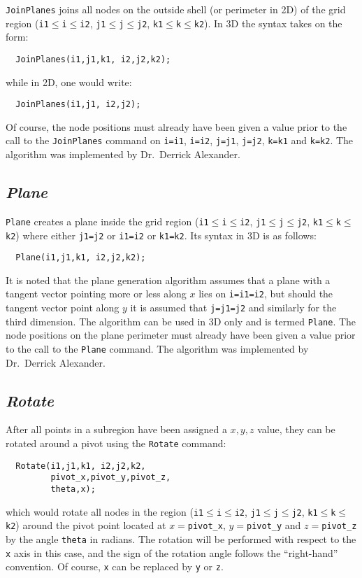 \documentclass{warpdoc}
\begin{document}
\verb|JoinPlanes| joins all nodes on the outside shell (or perimeter in 2D) of the
grid region (\verb|i1|$\leq$\verb|i|$\leq$\verb|i2|,
  \verb|j1|$\leq$\verb|j|$\leq$\verb|j2|,
  \verb|k1|$\leq$\verb|k|$\leq$\verb|k2|). In 3D the syntax takes on the form:
%
\begin{verbatim}
  JoinPlanes(i1,j1,k1, i2,j2,k2);
\end{verbatim}
%
while in 2D, one would write:
%
\begin{verbatim}
  JoinPlanes(i1,j1, i2,j2);
\end{verbatim}
%
Of course, the node positions must already have been given a value prior
to the call to the \verb|JoinPlanes| command on
\verb|i=i1|, \verb|i=i2|, \verb|j=j1|, \verb|j=j2|, \verb|k=k1| and
\verb|k=k2|. The algorithm was implemented by Dr.\ Derrick Alexander.


\subsection{\emph{Plane}}

\verb|Plane| creates a plane inside the
grid region (\verb|i1|$\leq$\verb|i|$\leq$\verb|i2|,
  \verb|j1|$\leq$\verb|j|$\leq$\verb|j2|,
  \verb|k1|$\leq$\verb|k|$\leq$\verb|k2|) where either
  \verb|j1=j2| or \verb|i1=i2| or \verb|k1=k2|. Its syntax in 3D is as follows:
%
\begin{verbatim}
  Plane(i1,j1,k1, i2,j2,k2);
\end{verbatim}
%
It is noted that the plane generation algorithm  assumes that a plane
with a tangent vector pointing more or less along $x$ lies on \verb|i=i1=i2|, but
should the tangent vector point along $y$ it is assumed that \verb|j=j1=j2|
and similarly for the third dimension.
The algorithm can be used in 3D only and is termed \verb|Plane|. 
The node positions on the plane perimeter must already have been given a value prior
to the call to the \verb|Plane| command. The algorithm was 
implemented by Dr.\ Derrick Alexander.


\subsection{\emph{Rotate}}

After all points in a subregion have been assigned
a  $x,y,z$ value, they can be rotated around a pivot
using the \verb|Rotate| command:
%
\begin{verbatim}
  Rotate(i1,j1,k1, i2,j2,k2,
         pivot_x,pivot_y,pivot_z,
         theta,x);
\end{verbatim}
%
which would rotate all nodes in the region
(\verb|i1|$\leq$\verb|i|$\leq$\verb|i2|,
  \verb|j1|$\leq$\verb|j|$\leq$\verb|j2|,
  \verb|k1|$\leq$\verb|k|$\leq$\verb|k2|)
around the pivot point located at $x=$\verb|pivot_x|,
$y=$\verb|pivot_y| and $z=$\verb|pivot_z| by the angle
\verb|theta| in radians. The rotation will be performed with respect to
the \verb|x| axis in this case, and the sign of
the rotation angle follows the ``right-hand''
convention. Of course, \verb|x| can be replaced by
\verb|y| or \verb|z|.
\end{document}
